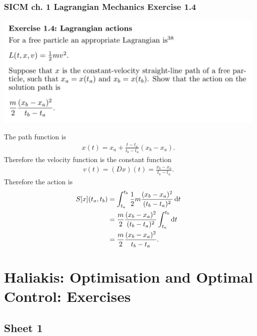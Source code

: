 \subsubsection*{SICM ch. 1 Lagrangian Mechanics Exercise 1.4}
\begin{mdframed}
  \includegraphics[width=400pt]{img/physics--classical-mechanics--sicm--1-4.png}
\end{mdframed}
The path function is
\begin{align*}
  x(t) = x_a + \frac{t - t_a}{t_b - t_a}(x_b - x_a).
\end{align*}
Therefore the velocity function is the constant function
\begin{align*}
  v(t) = (D x)(t) = \frac{x_b - x_a}{t_b - t_a}.
\end{align*}
Therefore the action is
\begin{align*}
  S[x](t_a, t_b) &= \int_{t_a}^{t_b}  \frac{1}{2}m \frac{(x_b - x_a)^2}{(t_b - t_a)^2} \d t \\
                 &= \frac{m}{2} \frac{(x_b - x_a)^2}{(t_b - t_a)^2}\int_{t_a}^{t_b} \d t \\
                 &= \frac{m}{2} \frac{(x_b - x_a)^2}{t_b - t_a}.
\end{align*}


\section{Haliakis: Optimisation and Optimal Control: Exercises}
\subsection{Sheet 1}
